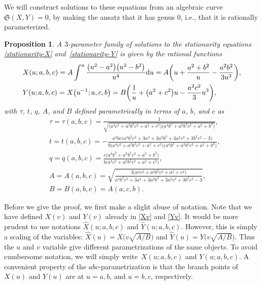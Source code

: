 \documentclass[10pt,a4paper]{amsart}
\numberwithin{equation}{section}
\newtheorem{Proposition}[Theorem]{Proposition}
 { \theoremstyle{definition}
\newtheorem{Definition}[Theorem]{Definition}
\newtheorem{Note}[Theorem]{Note}
\newtheorem{Example}[Theorem]{Example}
\newtheorem{Remark}[Theorem]{Remark} }
\begin{document}
We will construct solutions to these equations from an algebraic curve $\mathfrak{S}(X,Y) = 0$, by making the ansatz that it has genus $0$, i.e., that it is rationally parameterized.
\begin{Proposition}
 A $3$-parameter family of solutions to the stationarity equations \eqref{stationarity-X} and~\eqref{stationarity-Y} is given by the rational functions
 \begin{align}
 &X(u;a,b,c)= A \int^u \frac{\bigl(u^2-a^2\bigr)\bigl(u^2-b^2\bigr)}{u^4} {\rm d}u = A\biggl(u + \frac{a^2+b^2}{u} - \frac{a^2b^2}{3u^3}\biggr), \label{X-parameterization}\\
 &Y(u;a,b,c)= X\bigl(u^{-1};a,c,b\bigr) = B\biggl(\frac{1}{u} + \bigl(a^2+c^2\bigr)u - \frac{a^2c^2}{3}u^3\biggr),\nonumber%
 \end{align}
 with $\tau$, $t$, $q$, $A$, and $B$ defined parametrically in terms of $a$, $b$, and $c$ as
 \begin{align}
 &\tau= \tau(a,b,c) = \frac{1}{\sqrt{\bigl(a^4c^2 + a^2b^2c^2 + a^2 + c^2\bigr)\bigl(a^4b^2 + a^2b^2c^2 + a^2 + b^2\bigr)}}, \label{tau-param}\\
 &t= t(a,b,c) = -\frac{a^2bc\bigl(a^4b^2c^2 + 3a^4 + 3a^2b^2 + 3a^2c^2 + 3b^2c^2 - 3\bigr)}{9\bigl(a^4c^2 + a^2b^2c^2 + a^2 + c^2\bigr)\bigl(a^4b^2 + a^2b^2c^2 + a^2 + b^2\bigr)},\label{t-param}\\
 &q= q(a,b,c) = \frac{c\bigl(a^4b^2 + a^2b^2c^2 + a^2 + b^2\bigr)}{b\bigl(a^4c^2 + a^2b^2c^2 + a^2 + c^2\bigr)},\label{q-param}\\
 &A= A(a,b,c) = \sqrt{\frac{3\bigl(a^4c^2 + a^2b^2c^2 + a^2 + c^2\bigr)}{a^4b^2c^2 + 3a^4 + 3a^2b^2 + 3a^2c^2 + 3b^2c^2 - 3}}\label{A-param}, \\
 &B = B(a,b,c) = A(a,c,b).\nonumber
 \end{align}
\end{Proposition}
\begin{Remark}\label{uv-relation-remark} Before we give the proof, we first make a slight abuse of notation. Note that we have defined $X(v)$ and $Y(v)$ already in \eqref{Xv} and \eqref{Yv}. It would be more prudent to use notations $\hat X(u;a,b,c)$ and $\hat Y(u;a,b,c)$. However, this is simply a scaling of the variables: $\hat{X}(u) = X\bigl(v\sqrt{A/B}\bigr)$ and $\hat{Y}(u) = Y\bigl(v\sqrt{A/B}\bigr)$. Thus the $u$ and $v$ variable give different parametrizations of the same objects. To avoid cumbersome notation, we will simply write~$X(u;a,b,c)$ and $Y(u;a,b,c)$. A convenient property of the $abc$-parametrization is that the branch points of $X(u)$ and $Y(u)$ are at $u=a,b$, and $u=b,c$, respectively.
\end{Remark}
\end{document}
